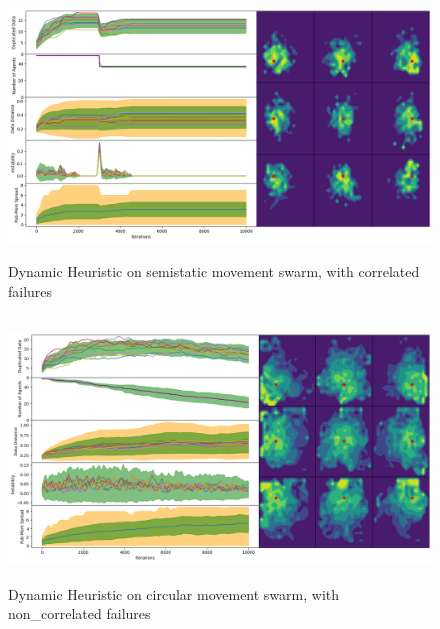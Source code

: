 \documentclass{UoYCSproject}
\begin{document}
\begin{figure}[htb]
\label{fig:static_movement_con2}
\begin{center}
\centering
\includegraphics[height=7cm]{"./Dynamic_Heuristic/Static_Move_con.png"}
\caption{Dynamic Heuristic on semi\-static movement swarm, with correlated failures}
\end{center}
\end{figure}

\begin{figure}[htb]
\label{fig:circle_movement_non2}
\begin{center}
\centering
\includegraphics[height=7cm]{"./Dynamic_Heuristic/Cicrle_Move_non.png"}
\caption{Dynamic Heuristic on circular movement swarm, with non\_correlated failures}
\end{center}
\end{figure}
\end{document}
